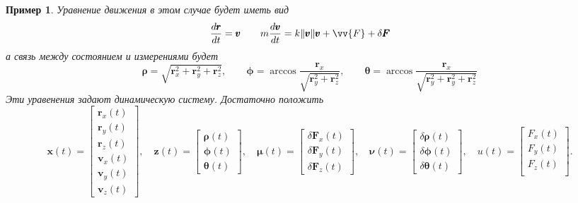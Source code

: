 \documentclass[12pt]{article}
\newtheorem{example}[theorem]{Пример}
\begin{document}
\begin{example}
    Уравнение движения в этом случае будет иметь вид
    \begin{equation}
        \frac{d \pmb{r}}{dt}=\pmb{v} \qquad
        m\frac{d \pmb{v}}{dt}=k\Vert \pmb{v}\Vert\pmb{v}+\vv{F}+\delta\pmb{F} \qquad
    \end{equation}
    а связь между состоянием и измерениями будет
    \begin{equation}
        \pmb{\rho}= \sqrt{\pmb{r}_x^2 + \pmb{r}_y^2 + \pmb{r}_z^2}, \qquad
        \pmb{\phi} = \arccos \frac{\pmb{r}_x}{\sqrt{\pmb{r}_y^2 + \pmb{r}_z^2}}, \qquad
        \pmb{\theta}=\arccos\frac{\pmb{r}_x}{\sqrt{\pmb{r}_y^2+\pmb{r}_y^2+\pmb{r}_z^2}}
    \end{equation}
    Эти уравенения задают динамическую систему. Достаточно положить
    \begin{equation}
        \pmb{x}(t)=\begin{bmatrix}
            \pmb{r}_x(t) \\ \pmb{r}_y(t) \\ \pmb{r}_z(t) \\
            \pmb{v}_x(t) \\ \pmb{v}_y(t) \\ \pmb{v}_z(t)
        \end{bmatrix},
        \quad
        \pmb{z}(t)=\begin{bmatrix}
            \pmb{\rho}(t) \\ \pmb{\phi}(t) \\ \pmb{\theta}(t)
        \end{bmatrix},
        \quad
        \pmb{\mu}(t)=\begin{bmatrix}
            \delta\pmb{F}_x(t) \\ \delta\pmb{F}_y(t) \\ \delta\pmb{F}_z(t)
        \end{bmatrix},
        \quad
        \pmb{\nu}(t)=\begin{bmatrix}
            \delta\pmb{\rho}(t) \\ \delta\pmb{\phi}(t) \\ \delta\pmb{\theta}(t)
        \end{bmatrix},
        \quad
        u(t)=\begin{bmatrix}
            F_x(t) \\
            F_y(t) \\
            F_z(t) \\
        \end{bmatrix}.
    \end{equation}


\end{example}
\end{document}
